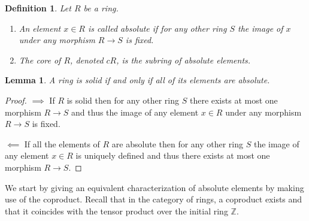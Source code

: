 \documentclass{amsart}
\newtheorem{definition}[subsection]{Definition}
\newtheorem{lemma}[subsection]{Lemma}
\newcommand{\Z}{{\mathbb Z}}
\begin{document}
    \begin{definition}
        Let $R$ be a ring.
        \begin{enumerate}
            \item An element $x \in R$ is called \emph{absolute} if for any other ring $S$ the image of $x$ under any morphism $R \to S$ is fixed.
            
            \item The \emph{core} of $R$, denoted $cR$, is the subring of absolute elements.
        \end{enumerate}
	\end{definition}

    \begin{lemma}
        A ring is solid if and only if all of its elements are absolute.
    \end{lemma}
    \begin{proof}
        $\implies$
        If $R$ is solid then for any other ring $S$ there exists at most one morphism $R \to S$ and thus the image of any element $x \in R$ under any morphism $R \to S$ is fixed.

        $\impliedby$
        If all the elements of $R$ are absolute then for any other ring $S$ the image of any element $x \in R$ is uniquely defined and thus there exists at most one morphism $R \to S$.
    \end{proof}

    We start by giving an equivalent characterization of absolute elements by making use of the coproduct. Recall that in the category of rings, a coproduct exists and that it coincides with the tensor product over the initial ring $\Z$.
\end{document}
